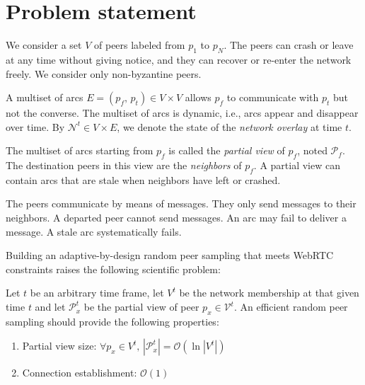
\section{Problem statement}
\label{sec:problem}

We consider a set $V$ of peers labeled from $p_1$ to $p_N$.  The peers can
crash or leave at any time without giving notice, and they can recover or
re-enter the network freely. We consider only non-byzantine peers.

A multiset of arcs $E = (p_f,\,p_t) \in V \times V$ allows $p_f$ to
communicate with $p_t$ but not the converse. The multiset of arcs is
dynamic, i.e., arcs appear and disappear over time. By $\mathcal{N}^t
\in V \times E$, we denote the state of the \emph{network overlay} at
time $t$.

The multiset of arcs starting from $p_f$ is called the \emph{partial
  view} of $p_f$, noted $\mathcal{P}_f$. The destination peers in this
view are the \emph{neighbors} of $p_f$. A partial view can contain
arcs that are stale when neighbors have left or crashed.

The peers communicate by means of messages. They only send messages to
their neighbors. A departed peer cannot send messages. An arc may fail
to deliver a message. A stale arc systematically fails.

Building an adaptive-by-design random peer sampling that meets WebRTC
constraints raises the following scientific problem:
\begin{problem}
  Let $t$ be an arbitrary time frame, let $V^t$ be the network membership at
  that given time $t$ and let $\mathcal{P}_x^t$ be the partial view of peer
  $p_x \in \mathcal{V}^t$.  An efficient random peer sampling should provide
  the following properties:
  \begin{enumerate}
  \item Partial view size: \hfill
    $\forall p_x \in V^t,\, |\mathcal{P}_x^t| = \mathcal{O} (\ln
    |V^t|)$      
  \item Connection establishment: \hfill $\mathcal{O}(1)$
  \end{enumerate}
\end{problem}

